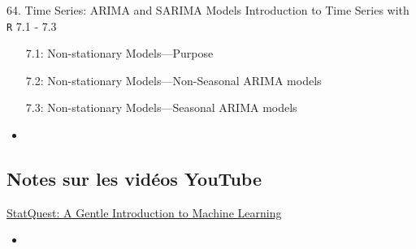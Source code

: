 \begin{CHPT_SUMM_AUTO}[label = {L.-64}]{64. Time Series: ARIMA and SARIMA Models}
Introduction to Time Series with \texttt{R} 7.1 - 7.3
\begin{itemize}
	\item[7.1:]	Non-stationary Models---Purpose
	\item[7.2:]	Non-stationary Models---Non-Seasonal ARIMA models
	\item[7.3:]	Non-stationary Models---Seasonal ARIMA models
\end{itemize}
\tcbline
	\begin{itemize}
		\item	
	\end{itemize}
\end{CHPT_SUMM_AUTO}

\subsection{Notes sur les vidéos YouTube}

\begin{YTB_SUMM}[label = {SQ-BASICS-ML-INTRO}]{\href{https://www.youtube.com/watch?v=Gv9_4yMHFhI&list=PLblh5JKOoLUICTaGLRoHQDuF_7q2GfuJF&index=2&t=0s}{StatQuest: A Gentle Introduction to Machine Learning}}
\begin{itemize}
	\item	
\end{itemize}
\end{YTB_SUMM}